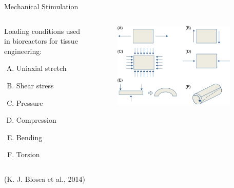 \documentclass[11pt,t]{beamer}
\begin{document}
\begin{frame}[fragile]{Mechanical Stimulation}  

	\begin{columns}[t]
		\begin{column}{.45\textwidth}
		 Loading conditions used in bioreactors for tissue engineering:
		\begin{enumerate}[A.]
		\item
		Uniaxial stretch
		\item
		Shear stress
		\item
		 Pressure
		\item
		Compression
		\item		
		Bending 
		\item
		Torsion 
		\end{enumerate}
 
		\end{column}
		\begin{column}{.55\textwidth}
			\vspace{-15pt}
			\begin{figure}
			\centering
			\includegraphics[width=0.9\textwidth]{loads}
			
			\end{figure}
		\end{column}
	\end{columns}	
		
	\vfill
	\footnotesize(K. J. Blosea et al., 2014)

\end{frame}
\end{document}
